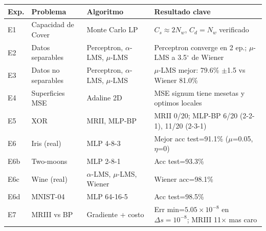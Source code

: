 \begin{tabular}{@{}lllp{5.5cm}@{}}
\toprule
Exp. & Problema & Algoritmo & Resultado clave \\
\midrule
E1 & Capacidad de Cover & Monte Carlo LP & $C_s\approx 2N_w$, $C_d=N_w$ verificado \\
E2 & Datos separables & Perceptron, $\alpha$-LMS, $\mu$-LMS & Perceptron converge en 2 ep.; $\mu$-LMS a 3.5$^\circ$ de Wiener \\
E3 & Datos no separables & Perceptron, $\alpha$-LMS, $\mu$-LMS & $\mu$-LMS mejor: 79.6\% $\pm$1.5 vs Wiener 81.0\% \\
E4 & Superficies MSE & Adaline 2D & MSE signum tiene mesetas y optimos locales \\
E5 & XOR & MRII, MLP-BP & MRII 0/20; MLP-BP 6/20 (2-2-1), 11/20 (2-3-1) \\
E6 & Iris (real) & MLP 4-8-3 & Mejor acc test=91.1\% ($\mu$=0.05, $\eta$=0) \\
E6b & Two-moons & MLP 2-8-1 & Acc test=93.3\% \\
E6c & Wine (real) & $\alpha$-LMS, $\mu$-LMS, Wiener & Wiener acc=98.1\% \\
E6d & MNIST-04 & MLP 64-16-5 & Acc test=98.5\% \\
E7 & MRIII vs BP & Gradiente + costo & Err min=$5.05{\times}10^{-8}$ en $\Delta s{=}10^{-8}$; MRIII 11$\times$ mas caro \\
\bottomrule
\end{tabular}
